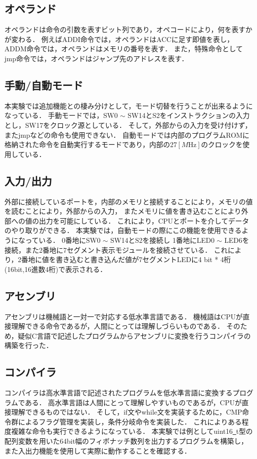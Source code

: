 \documentclass[a4paper,11pt]{ltjsarticle}
\begin{document}
\subsection{オペランド}
オペランドは命令の引数を表すビット列であり，オペコードにより，何を表すかが変わる．
例えばADDI命令では，オペランドはACCに足す即値を表し，
ADDM命令では，オペランドはメモリの番号を表す．
また，特殊命令としてjmp命令では，オペランドはジャンプ先のアドレスを表す．
\subsection{手動/自動モード}
本実験では追加機能との棲み分けとして，モード切替を行うことが出来るようになっている．
手動モードでは，SW0 $\sim$ SW14とS2をインストラクションの入力とし，SW17をクロック源としている．
そして，外部からの入力を受け付けず，またjmpなどの命令も使用できない．
自動モードでは内部のプログラムROMに格納された命令を自動実行するモードであり，内部の27$[M\text{Hz}]$のクロックを使用している．
\subsection{入力/出力}
外部に接続しているポートを，内部のメモリと接続することにより，メモリの値を読むことにより，外部からの入力，
またメモリに値を書き込むことにより外部への値の出力を可能にしている．
これにより，CPUとポートを介してデータのやり取りができる．
本実験では，自動モードの際にこの機能を使用できるようになっている．
0番地にSW0 $\sim$ SW14とS2を接続し
1番地にLED0 $\sim$ LED6を接続，また2番地に7セグメント表示モジュールを接続させている．
これにより，2番地に値を書き込むと書き込んだ値が7セグメントLEDに4 bit * 4桁(16bit,16進数4桁)で表示される．
\subsection{アセンブリ}
アセンブリは機械語と一対一で対応する低水準言語である．
機械語はCPUが直接理解できる命令であるが，人間にとっては理解しづらいものである．
そのため，疑似C言語で記述したプログラムからアセンブリに変換を行うコンパイラの構築を行った．
\subsection{コンパイラ}
コンパイラは高水準言語で記述されたプログラムを低水準言語に変換するプログラムである．
高水準言語は人間にとって理解しやすいものであるが，CPUが直接理解できるものではない．
そして，if文やwhile文を実装するために，CMP命令群によるフラグ管理を実装し，条件分岐命令を実装した．
これによりある程度複雑な命令も実行できるようになっている．
本実験では例としてuint16\underline{~}t型の配列変数を用いた64bit幅のフィボナッチ数列を出力するプログラムを構築し，
また入出力機能を使用して実際に動作することを確認する．
\end{document}
